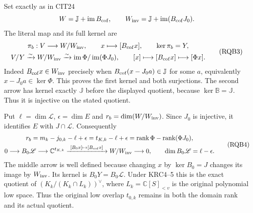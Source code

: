 \documentclass[10pt]{article}
\begin{document}
Set exactly as in CIT24
\[
 W=\mathbb J+\operatorname{im}B_{\rm cof},\qquad
 W_{\rm inv}=\mathbb J+\operatorname{im}(B_{\rm cof}J_0).
\]
The literal map and its full kernel are
\[
\begin{gathered}
 \pi_b:V\longrightarrow W/W_{\rm inv},\qquad
                 x\longmapsto[B_{\rm cof}x],\qquad \ker\pi_b=Y,\\
 V/Y\xrightarrow{\sim}W/W_{\rm inv}
 \xrightarrow{\sim}\operatorname{im}\Phi/\operatorname{im}(\Phi J_0),
 \qquad [x]\longmapsto[B_{\rm cof}x]\longmapsto[\Phi x].
\end{gathered}\tag{RQB3}
\]
Indeed $B_{\rm cof}x\in W_{\rm inv}$ precisely when
$B_{\rm cof}(x-J_0a)\in\mathbb J$ for some $a$, equivalently
$x-J_0a\in\ker\Phi$. This proves the first kernel and both
surjections. The second arrow has kernel exactly $\mathbb J$
before the displayed quotient, because $\ker\mathbb B=\mathbb J$.
Thus it is injective on the stated quotient.

Put $\ell=\dim\mathscr L$, $\epsilon=\dim E$ and $r_b=\dim(W/W_{\rm inv})$.
Since $J_0$ is injective, it identifies $E$ with $J\cap\mathscr L$.
Consequently
\[
\begin{gathered}
 r_b=m_k-j_{0,k}-\ell+\epsilon
    =t_{K,k}-\ell+\epsilon
    =\operatorname{rank}\Phi-\operatorname{rank}(\Phi J_0),\\
 0\longrightarrow B_0\mathscr L
   \longrightarrow\mathbb C^{t_{K,k}}
   \xrightarrow{\ [B_0x]\mapsto[B_{\rm cof}x]\ }W/W_{\rm inv}
   \longrightarrow0,\qquad
 \dim B_0\mathscr L=\ell-\epsilon .
\end{gathered}\tag{RQB4}
\]
The middle arrow is well defined because changing $x$ by $\ker B_0=J$
changes its image by $W_{\rm inv}$. Its kernel is $B_0Y=B_0\mathscr L$.
Under KRC4--5 this is the exact quotient of
$(K_k/(K_k\cap L_k))^\vee$, where $L_k=\mathbb C[S]_{<v}$ is
the original polynomial low space. Thus the original low overlap
$t_{0,k}$ remains in both the domain rank and its actual quotient.
\end{document}
